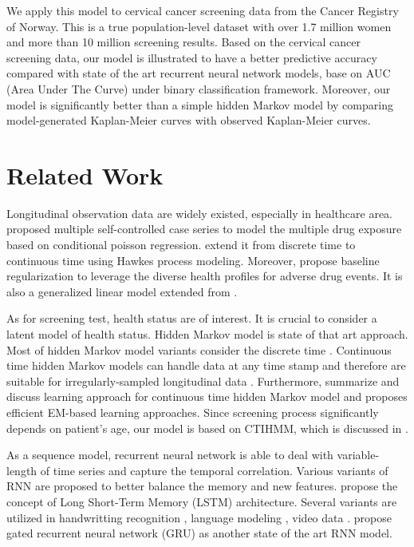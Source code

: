 \documentclass{article}
\begin{document}
We apply this model to cervical cancer screening data from the Cancer Registry of Norway. This is a true population-level dataset with over 1.7 million women and more than 10 million screening results. Based on the cervical cancer screening data, our model is illustrated to have a better predictive accuracy compared with state of the art recurrent neural network models, base on AUC (Area Under The Curve) under binary classification framework. Moreover, our model is significantly better than a simple hidden Markov model by comparing model-generated Kaplan-Meier curves with observed Kaplan-Meier curves.

\section{Related Work}
Longitudinal observation data are widely existed, especially in healthcare area. \cite{Simpson_2013} proposed multiple self-controlled case series to model the multiple drug exposure based on conditional poisson regression. \cite{Bao_2017} extend it from discrete time to continuous time using Hawkes process modeling. Moreover, \cite{Kuang_2017} propose baseline regularization to leverage the diverse health profiles for adverse drug events. It is also a generalized linear model extended from \cite{Kuang_2016}.

As for screening test, health status are of interest. It is crucial to consider a latent model of health status. Hidden Markov model is state of that art approach. Most of hidden Markov model variants consider the discrete time \citep{Gael_2008,Beal02,Cem_2014}. Continuous time hidden Markov models can handle data at any time stamp \cite{Cox_1965} and therefore are suitable for irregularly-sampled longitudinal data \citep{Bartolonemo_2011,Liu_2013,Wang_2014}. Furthermore, \cite{Liu_2015} summarize and discuss learning approach for continuous time hidden Markov model and proposes efficient EM-based learning approaches. Since screening process significantly depends on patient's age, our model is based on CTIHMM, which is discussed in \cite{Sonnernberg_1993,Myers_2000,Canfell_2004}.

As a sequence model, recurrent neural network is able to deal with variable-length of time series and capture the temporal correlation. Various variants of RNN are proposed to better balance the memory and new features. \cite{Hochreiter_1997, Cho_2014} propose the concept of Long Short-Term Memory (LSTM) architecture. Several variants are utilized in handwritting recognition \citep{Doestsch_2014} , language modeling \citep{Stephen_2017}, video data \citep{Zhang_2016}. \cite{Chung_2014} propose gated recurrent neural network (GRU) as another state of the art RNN model.
\end{document}
